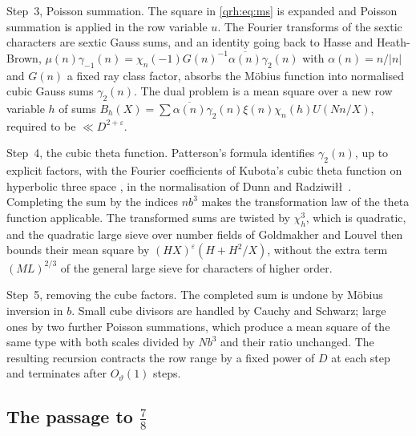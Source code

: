 Step~3, Poisson summation. The square in \eqref{qrh:eq:ms} is expanded and Poisson summation is applied in the row variable $u$. The Fourier transforms of the sextic characters are sextic Gauss sums, and an identity going back to Hasse and Heath-Brown, $\mu(n)\gamma_{-1}(n)=\chi_n(-1)G(n)^{-1}\overline{\alpha(n)}\gamma_2(n)$ with $\alpha(n)=n/|n|$ and $G(n)$ a fixed ray class factor, absorbs the M\"obius function into normalised cubic Gauss sums $\gamma_2(n)$. The dual problem is a mean square over a new row variable $h$ of sums $B_h(X)=\sum\overline{\alpha(n)}\gamma_2(n)\xi(n)\chi_n(h)U(Nn/X)$, required to be $\ll D^{2+\varepsilon}$.

Step~4, the cubic theta function. Patterson's formula identifies $\gamma_2(n)$, up to explicit factors, with the Fourier coefficients of Kubota's cubic theta function on hyperbolic three space \cite{NCKubota69,NCPatterson77}, in the normalisation of Dunn and Radziwi\l\l\ \cite{NCDunnRadziwill24}. Completing the sum by the indices $nb^3$ makes the transformation law of the theta function applicable. The transformed sums are twisted by $\chi_h^3$, which is quadratic, and the quadratic large sieve over number fields of Goldmakher and Louvel \cite{NCGoldmakherLouvel13} then bounds their mean square by $(HX)^\varepsilon(H+H^2/X)$, without the extra term $(ML)^{2/3}$ of the general large sieve for characters of higher order.

Step~5, removing the cube factors. The completed sum is undone by M\"obius inversion in $b$. Small cube divisors are handled by Cauchy and Schwarz; large ones by two further Poisson summations, which produce a mean square of the same type with both scales divided by $Nb^3$ and their ratio unchanged. The resulting recursion contracts the row range by a fixed power of $D$ at each step and terminates after $O_\vartheta(1)$ steps.


\subsection{The passage to $\frac78$}

